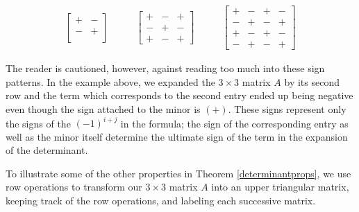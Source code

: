 \[ \begin{array}{ccc}

\left[ \begin{array}{cc} + & - \\ - & + \\ \end{array} \right] 

&
\qquad 

\left[ \begin{array}{ccc} + & - & + \\ - & + & - \\ + & - & +  \end{array} \right] 


&

\qquad

\left[ \begin{array}{cccc} + & - & + & - \\ - & + & - & +\\ + & - & + & - \\ - & + & - & + \end{array} \right] 

\end{array} \]

The reader is cautioned, however, against reading too much into these sign patterns.  In the example above, we expanded the $3 \times 3$ matrix $A$ by its second row and the term which corresponds to the second entry ended up being negative even though the sign attached to the minor is $(+)$.  These signs represent only the signs of the $(-1)^{i+j}$ in the formula;  the sign of the corresponding entry as well as the minor itself determine the ultimate sign of the term in the expansion of the determinant.

\smallskip

To illustrate some of the other properties in  Theorem \ref{determinantprops}, we use row operations to transform our $3 \times 3$ matrix $A$ into an upper triangular matrix, keeping track of the row operations, and labeling each successive matrix.



